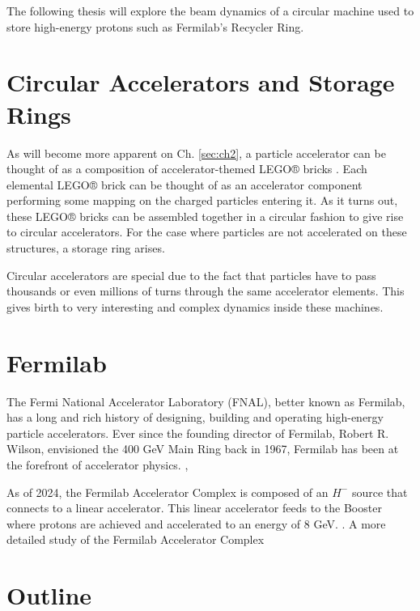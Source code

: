 The following thesis will explore the beam dynamics of a circular machine used to store high-energy protons such as Fermilab's Recycler Ring.         

\section{Circular Accelerators and Storage Rings}

As will become more apparent on Ch. \ref{sec:ch2}, a particle accelerator can be thought of as a composition of accelerator-themed LEGO® bricks \cite{forest}. Each elemental LEGO® brick can be thought of as an accelerator component performing some mapping on the charged particles entering it. As it turns out, these LEGO® bricks can be assembled together in a circular fashion to give rise to circular accelerators. For the case where particles are not accelerated on these structures, a storage ring arises.     

Circular accelerators are special due to the fact that particles have to pass thousands or even millions of turns through the same accelerator elements. This gives birth to very interesting and complex dynamics inside these machines.   

\section{Fermilab}

The Fermi National Accelerator Laboratory (FNAL), better known as Fermilab, has a long and rich history of designing, building and operating high-energy particle accelerators. Ever since the founding director of Fermilab, Robert R. Wilson, envisioned the 400 GeV Main Ring back in 1967, Fermilab has been at the forefront of accelerator physics.     \cite{tevatron},\cite{fermilab1}

As of 2024, the Fermilab Accelerator Complex is composed of an $H^-$ source that connects to a linear accelerator. This linear accelerator feeds to the Booster where protons are achieved and accelerated to an energy of 8 GeV. . A more detailed study of the Fermilab Accelerator Complex  

\section{Outline}

